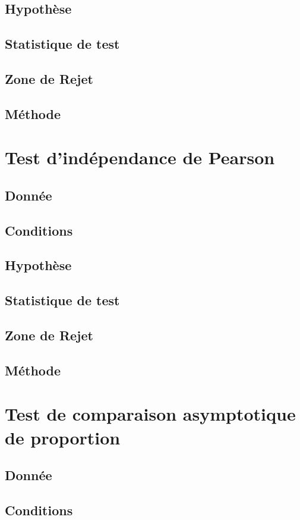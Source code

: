 \documentclass{article}
\theoremstyle{plain}%
\theoremstyle{definition}
\theoremstyle{remark}
\begin{document}
\subsection*{Hypothèse}
\subsection*{Statistique de test}
\subsection*{Zone de Rejet}
\subsection*{Méthode}

\section{Test d'indépendance de Pearson}
\subsection*{Donnée}
\subsection*{Conditions}
\subsection*{Hypothèse}
\subsection*{Statistique de test}
\subsection*{Zone de Rejet}
\subsection*{Méthode}

\section{Test de comparaison asymptotique de proportion}
\subsection*{Donnée}
\subsection*{Conditions}
\end{document}
